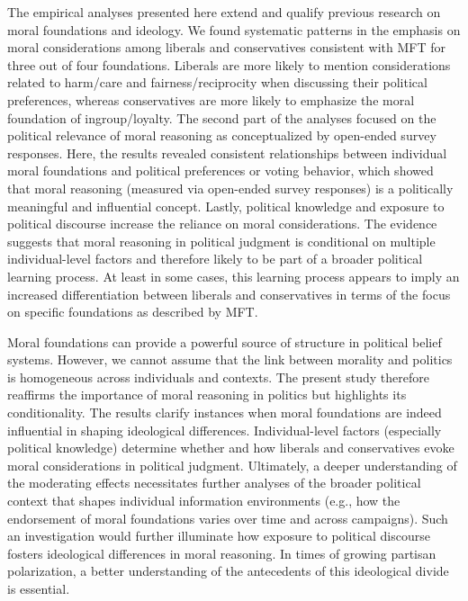 \documentclass[12pt]{article}
\begin{document}
The empirical analyses presented here extend and qualify previous research on moral foundations and ideology. We found systematic patterns in the emphasis on moral considerations among liberals and conservatives consistent with MFT for three out of four foundations. Liberals are more likely to mention considerations related to harm/care and fairness/reciprocity when discussing their political preferences, whereas conservatives are more likely to emphasize the moral foundation of ingroup/loyalty. The second part of the analyses focused on the political relevance of moral reasoning as conceptualized by open-ended survey responses. Here, the results revealed consistent relationships between individual moral foundations and political preferences or voting behavior, which showed that moral reasoning (measured via open-ended survey responses) is a politically meaningful and influential concept. Lastly, political knowledge and exposure to political discourse increase the reliance on moral considerations. The evidence suggests that moral reasoning in political judgment is conditional on multiple individual-level factors and therefore likely to be part of a broader political learning process. At least in some cases, this learning process appears to imply an increased differentiation between liberals and conservatives in terms of the focus on specific foundations as described by MFT.

Moral foundations can provide a powerful source of structure in political belief systems. However, we cannot assume that the link between morality and politics is homogeneous across individuals and contexts. The present study therefore reaffirms the importance of moral reasoning in politics but highlights its conditionality. The results clarify instances when moral foundations are indeed influential in shaping ideological differences. Individual-level factors (especially political knowledge) determine whether and how liberals and conservatives evoke moral considerations in political judgment. Ultimately, a deeper understanding of the moderating effects necessitates further analyses of the broader political context that shapes individual information environments (e.g., how the endorsement of moral foundations varies over time and across campaigns). Such an investigation would further illuminate how exposure to political discourse fosters ideological differences in moral reasoning. In times of growing partisan polarization, a better understanding of the antecedents of this ideological divide is essential.
\end{document}
